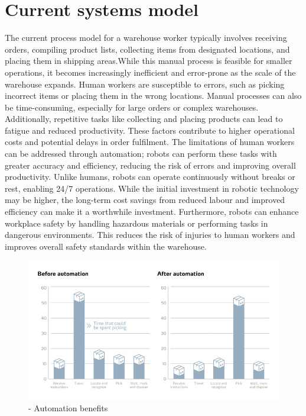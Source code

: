 \newpage

\section{Current systems model} %

The current process model for a warehouse worker typically involves receiving orders, compiling product lists, collecting items from designated locations, and placing them in shipping areas.\newline \textbf{}\newline While this manual process is feasible for smaller operations, it becomes increasingly inefficient and error-prone as the scale of the warehouse expands. Human workers are susceptible to errors, such as picking incorrect items or placing them in the wrong locations. Manual processes can also be time-consuming, especially for large orders or complex warehouses. Additionally, repetitive tasks like collecting and placing products can lead to fatigue and reduced productivity. These factors contribute to higher operational costs and potential delays in order fulfilment. \newline \textbf{}\newline The limitations of human workers can be addressed through automation; robots can perform these tasks with greater accuracy and efficiency, reducing the risk of errors and improving overall productivity. Unlike humans, robots can operate continuously without breaks or rest, enabling 24/7 operations. \newline \textbf{}\newline While the initial investment in robotic technology may be higher, the long-term cost savings from reduced labour and improved efficiency can make it a worthwhile investment. Furthermore, robots can enhance workplace safety by handling hazardous materials or performing tasks in dangerous environments. This reduces the risk of injuries to human workers and improves overall safety standards within the warehouse.
\begin{figure}[h]
    \centering
    \includegraphics[width=0.8\linewidth]{automation+.png}
    \caption{ - Automation benefits \cite{warehouseauto}}
\end{figure}


